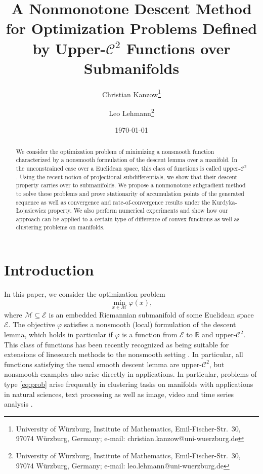\documentclass[a4paper, 12pt]{article}
\date{\today}
\title{A Nonmonotone Descent Method for Optimization Problems
Defined by Upper-$\mathcal{C}^2 $ Functions over Submanifolds}
\author{Christian Kanzow\footnote{University of W\"urzburg, Institute
	of Mathematics, Emil-Fischer-Str.\ 30, 97074 W\"urzburg, Germany; 
	e-mail: christian.kanzow@uni-wuerzburg.de}
	\and Leo Lehmann\footnote{University of W\"urzburg, Institute
		of Mathematics, Emil-Fischer-Str.\ 30, 97074 W\"urzburg, Germany; 
		e-mail: leo.lehmann@uni-wuerzburg.de} }
\numberwithin{equation}{section}
\theoremstyle{bolddef}
\theoremstyle{definition}
\theoremstyle{boldplain}
\newcommand{\R}{\mathbb{R}}
\newcommand{\X}{\mathcal{E}}
\begin{document}
\maketitle

\begin{abstract}
We consider the optimization problem of minimizing a nonsmooth function characterized by a nonsmooth formulation of the descent lemma over a manifold. In the unconstrained case over a Euclidean space, this class of functions is called upper-$\mathcal{C}^2$. Using the recent notion of projectional subdifferentials, we show that their descent property carries over to submanifolds. We propose a nonmonotone subgradient method to solve these problems and prove stationarity of accumulation points of the generated sequence as well as convergence and rate-of-convergence results under the Kurdyka-{\L}ojasiewicz property. We also perform numerical experiments and show how our approach can be applied to a certain type of difference of convex functions as well as clustering problems on manifolds.
\end{abstract}

\section{Introduction}

In this paper, we consider the optimization problem
\begin{equation}\label{eq:prob}
	\min_{x \in \mathcal{M}} \varphi(x),
\end{equation}
where $\mathcal{M} \subseteq \X$ is an embedded Riemannian submanifold of some Euclidean space $\X$. The objective $\varphi$ satisfies a nonsmooth (local) formulation of the descent lemma, which holds in particular if $\varphi$ is a function from $\X$ to $\R$ and upper-$\mathcal{C}^2$. This class of functions has been recently recognized as being suitable for extensions of linesearch methods to the nonsmooth setting \cite{aragon2025}. In particular, all functions satisfying the usual smooth descent lemma are upper-$\mathcal{C}^2$, but nonsmooth examples also arise directly in applications. In particular, problems of type \eqref{eq:prob} arise frequently in clustering tasks on manifolds with applications in natural sciences, text processing as well as image, video and time series analysis \cite{Bendokat2024,Cetingul2009,Dhillon2001,Golzy2016,Gruber2006,Jung2021,Oh2019,Sengupta2017,Wiechers2021}.
\end{document}
